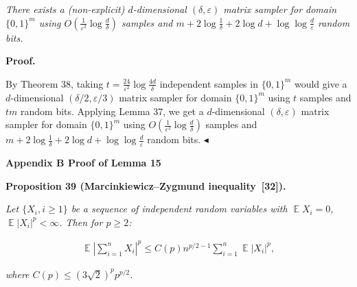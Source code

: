 \documentclass[10pt,a4paper]{article}
\begin{document}
\emph{There exists a (non-explicit) $d$-dimensional $(\delta,\varepsilon)$ matrix sampler for domain $\{0,1\}^{m}$ using $O(\frac{1}{\varepsilon^{2}}\log\frac{d}{\delta})$ samples and $m+2\log\frac{1}{\delta}+2\log d+\log\log\frac{d}{\varepsilon}$ random bits.}\par








\par\medskip\noindent\textbf{Proof.}\par




By Theorem 38, taking $t=\frac{24}{\varepsilon^{2}}\log\frac{4d}{\delta}$ independent samples in $\{0,1\}^{m}$ would give a $d$-dimensional $(\delta/2,\varepsilon/3)$ matrix sampler for domain $\{0,1\}^{m}$ using $t$ samples and $tm$ random bits. Applying Lemma 37, we get a $d$-dimensional $(\delta,\varepsilon)$ matrix sampler for domain $\{0,1\}^{m}$ using $O(\frac{1}{\varepsilon^{2}}\log\frac{d}{\delta})$ samples and $m+2\log\frac{1}{\delta}+2\log d+\log\log\frac{d}{\varepsilon}$ random bits.
$\blacktriangleleft$\par






\par\medskip\noindent\textbf{
Appendix B Proof of Lemma 15
}\par





\par\medskip\noindent\textbf{
\textbf{Proposition 39}\textbf{ }(Marcinkiewicz–Zygmund inequality [32])\textbf{.}
}\par



\emph{Let $\{X_{i},i\geq 1\}$ be a sequence of independent random variables with $\operatorname*{\mathbb{E}}X_{i}=0$, $\operatorname*{\mathbb{E}}|X_{i}|^{p}<\infty$. Then for $p\geq 2$:}\par


\[\begin{gathered}
\operatorname*{\mathbb{E}}\left|\sum_{i=1}^{n}X_{i}\right|^{p}\leq C(p)n^{p/2-1}\sum_{i=1}^{n}\operatorname*{\mathbb{E}}|X_{i}|^{p},
\end{gathered}\]


\emph{where $C(p)\leq(3\sqrt{2})^{p}p^{p/2}$.}\par
\end{document}
